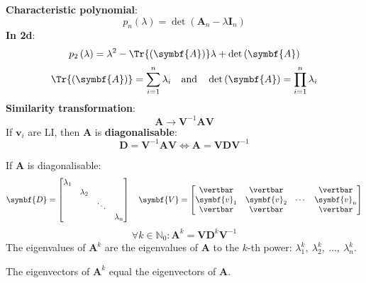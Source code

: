 \documentclass{article}
\begin{document}
\begin{minipage}[t]{126.1962963mm}
\begin{multicols*}{2}
        \textbf{Characteristic polynomial}:
        \begin{equation*}
            p_n\left(\lambda\right) = \det{\left( \symbf{A}_n - \lambda\symbf{I}_n \right)}
        \end{equation*}
        \textbf{In 2d}:
        \begin{equation*}
            p_2\left(\lambda\right) = \lambda^2-\Tr{\left( \symbf{A} \right)}\lambda + \det{\left( \symbf{A} \right)}
        \end{equation*}
        \begin{equation*}
            \Tr{\left( \symbf{A} \right)} = \sum_{i=1}^n \lambda_i \quad \text{and} \quad
            \det{\left( \symbf{A} \right)} = \prod_{i=1}^n \lambda_i
        \end{equation*}
        \textbf{Similarity transformation}:
        \begin{equation*}
            \symbf{A}\rightarrow \symbf{V}^{-1}\symbf{A}\symbf{V}
        \end{equation*}
        If \(\symbf{v}_i\) are LI, then \(\symbf{A}\) is
        \textbf{diagonalisable}:
        \begin{equation*}
            \symbf{D}=\symbf{V}^{-1}\symbf{A}\symbf{V} \iff \symbf{A}=\symbf{V}\symbf{D}\symbf{V}^{-1}
        \end{equation*}
    \end{multicols*}
    If \(\symbf{A}\) is diagonalisable:
    \begin{equation*}
        \symbf{D}=
        \begin{bmatrix}
            \lambda_1                         \\
             & \lambda_2                      \\
             &           & \ddots             \\
             &           &        & \lambda_n
        \end{bmatrix} \quad
        \symbf{V}=
        \begin{bmatrix}
            \vertbar      & \vertbar      &        & \vertbar      \\
            \symbf{v}_1 & \symbf{v}_2 & \cdots & \symbf{v}_n \\
            \vertbar      & \vertbar      &        & \vertbar
        \end{bmatrix}
    \end{equation*}
    \begin{equation*}
        \forall k \in \mathbb{N}_0:\symbf{A}^k = \symbf{V} \symbf{D}^k \symbf{V}^{-1}
    \end{equation*}
    The eigenvalues of \(\symbf{A}^k\) are the eigenvalues of \(\symbf{A}\)
    to the \(k\)-th power: \(\lambda_1^k,\: \lambda_2^k,\: \dots,\: \lambda_n^k\).

    The eigenvectors of \(\symbf{A}^k\) equal the eigenvectors of \(\symbf{A}\).
\end{minipage}
\end{document}
